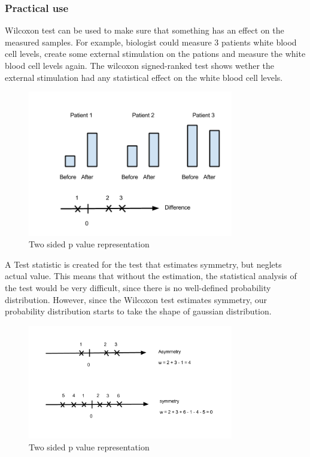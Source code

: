 \documentclass[12pt]{article}
\begin{document}
\subsubsection{Practical use}
Wilcoxon test can be used to make sure that something has an effect on the measured samples. For example, biologist could measure 3 patients white blood cell levels, create some external stimulation on the pations and measure the white blood cell levels again. The wilcoxon signed-ranked test shows wether the external stimulation had any statistical effect on the white blood cell levels.

\begin{figure}[!h]
  \centering
  \includegraphics[width=0.8\textwidth]{patientExample}
  \caption{Two sided p value representation}
  \label{fig:patientExample}
\end{figure}

A Test statistic is created for the test that estimates symmetry, but neglets actual value. This means that without the estimation, the statistical analysis of the test would be very difficult, since there is no well-defined probability distribution. However, since the Wilcoxon test estimates symmetry, our probability distribution starts to take the shape of gaussian distribution.

\begin{figure}[!h]
  \centering
  \includegraphics[width=0.8\textwidth]{symmetriassymetry}
  \caption{Two sided p value representation}
  \label{fig:symmetriassymetry}
\end{figure}
\end{document}
